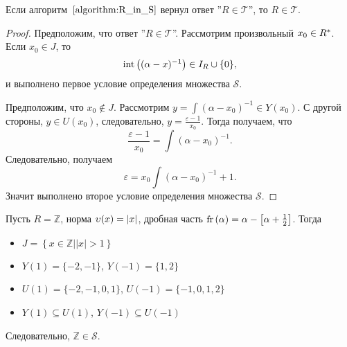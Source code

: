 \documentclass[_00_dissertation.tex]{subfiles}
\begin{document}
\begin{proposition}
    Если алгоритм~$\ref{algorithm:R_in_S}$ вернул ответ ''$R \in \mathcal{T}$'', то $R \in \mathcal{T}$.
\end{proposition}
\begin{proof}
    Предположим, что ответ ''$R \in \mathcal{T}$''.
    Рассмотрим произвольный $x_0 \in R^{*}$.
    Если $x_0 \in J$, то
    \begin{equation*}
        \textrm{int}\left((\alpha - x)^{-1}\right) \in I_{R} \cup \{0\},
    \end{equation*}
    и выполнено первое условие определения множества $\mathcal{S}$.
    
    Предположим, что $x_0 \not\in J$.
    Рассмотрим $y = \int{(\alpha - x_0)^{-1}} \in Y(x_0)$.
    С другой стороны, $y \in U(x_0)$, следовательно, $y = \frac{\varepsilon - 1}{x_0}$.
    Тогда получаем, что
    \begin{equation*}
        \frac{\varepsilon - 1}{x_0} = \int{(\alpha - x_0)^{-1}}.
    \end{equation*}
    Следовательно, получаем
    \begin{equation*}
        \varepsilon = x_0 \int{(\alpha - x_0)^{-1}} + 1.
    \end{equation*}
    Значит выполнено второе условие определения множества $\mathcal{S}$.
\end{proof}


\begin{example}\label{example:Z}
    Пусть $R = \mathbb{Z}$, норма $\upsilon(x) = |x|$, дробная часть $\textrm{fr}\left(\alpha\right) = \alpha - \left[\alpha + \frac{1}{2}\right]$.
    Тогда
    \begin{itemize}
        \item $J = \left\{x \in \mathbb{Z} \big| |x| > 1\right\}$
        
        \item $Y(1) = \{-2, -1\}$, $Y(-1) = \{1, 2\}$
        
        \item $U(1) = \{-2, -1, 0, 1\}$, $U(-1) = \{-1, 0, 1, 2\}$
        
        \item $Y(1) \subseteq U(1)$, $Y(-1) \subseteq U(-1)$
    \end{itemize}
    
    Следовательно, $\mathbb{Z} \in \mathcal{S}$.
\end{example}
\end{document}
